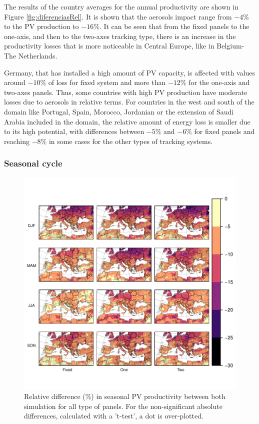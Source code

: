 The results of the country averages for the annual productivity are shown in Figure \ref{fig:diferenciasRel}. It is shown that the aerosols impact range from $-4\%$ to the PV production to $-16\%$. It can be seen that from the fixed panels to the one-axis, and then to the two-axes tracking type, there is an increase in the productivity losses that is more noticeable in Central Europe, like in Belgium-The Netherlands.

Germany, that has installed a high amount of PV capacity, is affected with values around $-10\%$ of loss for fixed system and more than $-12\%$ for the one-axis and two-axes panels. Thus, some countries with high PV production have moderate losses due to aerosols in relative terms. For countries in the west and south of the domain like Portugal, Spain, Morocco, Jordanian or the extension of Saudi Arabia included in the domain, the relative amount of energy loss is smaller due to its high potential, with differences between $-5\%$ and $-6\%$ for fixed panels and reaching $-8\%$ in some cases for the other types of tracking systems.

\subsubsection{Seasonal cycle}

\begin{figure}[h!]
  \centering
  \includegraphics[width=1\textwidth]{figs/capitulo6/RelDif_aer_no_all20032009SIGt.pdf}
\caption[Differences in seasonal PV productivity between simulations with and without aerosols]{Relative difference (\%) in seasonal PV productivity between both simulation for all type of panels. For the non-significant absolute differences, calculated with a 't-test', a dot is over-plotted.}
\label{mapas}
\end{figure}

